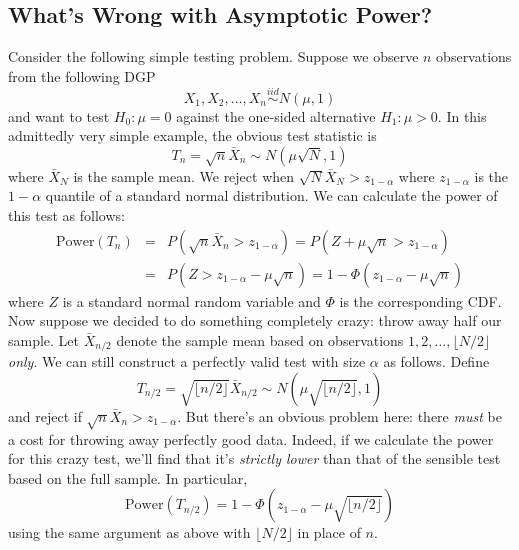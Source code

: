 \subsection{What's Wrong with Asymptotic Power?}
Consider the following simple testing problem. Suppose we observe $n$ observations from the following DGP
$$X_1, X_2, \hdots, X_{n} \overset{iid}{\sim}N(\mu, 1)$$
and want to test $H_0\colon \mu = 0$ against the one-sided alternative $H_1\colon \mu >0$. 
In this admittedly very simple example, the obvious test statistic is
$$T_{n} = \sqrt{n} \bar{X}_{n} \sim N\left(\mu \sqrt{N}, 1\right)$$
where $\bar{X}_{N}$ is the sample mean. We reject when $\sqrt{N} \bar{X}_{N}>z_{1-\alpha}$ where $z_{1-\alpha}$ is the $1-\alpha$ quantile of a standard normal distribution. 
We can calculate the power of this test as follows:
\begin{eqnarray*}
\mbox{Power}(T_{n}) &=& P\left(\sqrt{n} \bar{X}_{n}>z_{1-\alpha}\right) = P\left(Z + \mu\sqrt{n} >z_{1-\alpha}\right)\\
&=&P\left(Z >z_{1-\alpha} - \mu\sqrt{n}\right) = 1 - \Phi\left(z_{1-\alpha} - \mu\sqrt{n}\right)
\end{eqnarray*}
where $Z$ is a standard normal random variable and $\Phi$ is the corresponding CDF. 
Now suppose we decided to do something completely crazy: throw away half our sample. Let $\bar{X}_{n/2}$ denote the sample mean based on observations $1, 2, \hdots, \lfloor N/2 \rfloor $ \emph{only}. 
We can still construct a perfectly valid test with size $\alpha$ as follows. 
Define
$$T_{n/2} = \sqrt{\lfloor n/2 \rfloor } \bar{X}_{n/2} \sim N\left(\mu \sqrt{\lfloor n/2 \rfloor }, 1\right)$$
and reject if $\sqrt{n} \bar{X}_n > z_{1-\alpha}$.
But there's an obvious problem here: there \emph{must} be a cost for throwing away perfectly good data. 
Indeed, if we calculate the power for this crazy test, we'll find that it's \emph{strictly lower} than that of the sensible test based on the full sample. 
In particular,
$$\mbox{Power}(T_{n/2}) = 1 - \Phi\left(z_{1-\alpha} - \mu\sqrt{\lfloor n/2 \rfloor }\right)$$
using the same argument as above with $\lfloor N/2 \rfloor $ in place of $n$.

